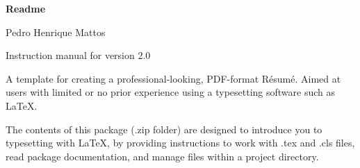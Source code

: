 \documentclass[10pt, a4paper]{article}
\begin{document}
\begin{center}
{\Huge\bfseries\normalfont Readme}
\par
Pedro Henrique Mattos
\par
Instruction manual for version 2.0
\end{center}



A template for creating a professional-looking, PDF-format R\'esum\'e. Aimed at users with limited or no prior experience using a typesetting software such as \LaTeX. \par

The contents of this package (.zip folder) are designed to introduce you to typesetting with \LaTeX, by providing instructions to work with .tex and .cls files, read package documentation, and manage files within a project directory. \par


\tableofcontents

\clearpage










\end{document}
